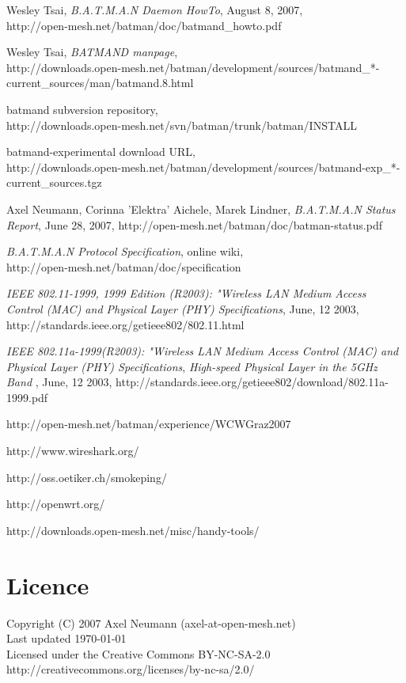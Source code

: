 \documentclass[11pt]{article}
\begin{document}
\begin{thebibliography}{1}

{Wesley Tsai},
{\it B.A.T.M.A.N Daemon HowTo}, {August 8, 2007},\\
{http://open-mesh.net/batman/doc/batmand\_howto.pdf}

{Wesley Tsai},
{\it BATMAND manpage},\\
{http://downloads.open-mesh.net/batman/development/sources/batmand\_*-current\_sources/man/batmand.8.html}

{batmand subversion repository},\\
{http://downloads.open-mesh.net/svn/batman/trunk/batman/INSTALL}

{batmand-experimental download URL},\\
{http://downloads.open-mesh.net/batman/development/sources/batmand-exp\_*-current\_sources.tgz}


{Axel Neumann, Corinna 'Elektra' Aichele, Marek Lindner},
{\it B.A.T.M.A.N Status Report}, {June 28, 2007},
{http://open-mesh.net/batman/doc/batman-status.pdf}

{\it B.A.T.M.A.N Protocol Specification}, {online wiki},\\
{http://open-mesh.net/batman/doc/specification}


	{\it IEEE 802.11-1999, 1999 Edition (R2003): "Wireless LAN Medium
	Access Control (MAC) and Physical Layer (PHY) Specifications},
  {June, 12 2003},	
	http://standards.ieee.org/getieee802/802.11.html

	{\it IEEE 802.11a-1999(R2003): "Wireless LAN Medium Access Control (MAC) and Physical Layer (PHY) Specifications},
	{\it High-speed Physical Layer in the 5GHz Band },
  {June, 12 2003},	
	http://standards.ieee.org/getieee802/download/802.11a-1999.pdf

 http://open-mesh.net/batman/experience/WCWGraz2007 

 http://www.wireshark.org/

 http://oss.oetiker.ch/smokeping/

 http://openwrt.org/

 http://downloads.open-mesh.net/misc/handy-tools/

\end{thebibliography}

\section*{Licence}

Copyright (C) 2007 Axel Neumann (axel-at-open-mesh.net) \\
Last updated \today\\
Licensed under the Creative Commons BY-NC-SA-2.0 \\
http://creativecommons.org/licenses/by-nc-sa/2.0/
\end{document}
